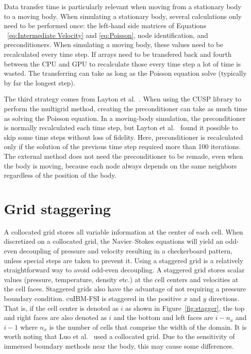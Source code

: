 Data transfer time is particularly relevant when moving from a stationary body to a moving body.
When simulating a stationary body, several calculations only need to be performed once: the left-hand side matrices of Equations ~\eqref{eq:Intermediate Velocity} and \eqref{eq:Poisson}, node identification, and preconditioners. 
When simulating a moving body, these values need to be recalculated every time step. 
If arrays need to be transfered back and fourth between the CPU and GPU to recalculate those every time step a lot of time is wasted.
The transferring can take as long as the Poisson equation solve (typically by far the longest step). 

The third strategy comes from Layton et al.~\cite{layton2011cuibm}.
When using the CUSP library to perform the multigrid method, creating the preconditioner can take as much time as solving the Poisson equation.
In a moving-body simulation, the preconditioner is normally recalculated each time step, but Layton et al.~\cite{layton2011cuibm} found it possible to skip some time steps without loss of fidelity.
Here, preconditioner is recalculated only if the solution of the previous time step required more than 100 iterations. 
The external method does not need the preconditioner to be remade, even when the body is moving, because each node always depends on the same neighbors regardless of the position of the body. 


\section{Grid staggering}
\label{Grid Staggering}

A collocated grid stores all variable information at the center of each cell.
When discretized on a collocated grid, the Navier--Stokes equations will yield an odd-even decoupling of pressure and velocity resulting in a checkerboard pattern, unless special steps are taken to prevent it. 
Using a staggered grid is a relatively straightforward way to avoid odd-even decoupling. 
A staggered grid stores scalar values (pressure, temperature, density etc.) at the cell centers and velocities at the cell faces. 
Staggered grids also have the advantage of not requiring a pressure boundary condition. 
cuIBM-FSI is staggered in the positive $x$ and $y$ directions. 
That is, if the cell center is denoted as $i$ as shown in Figure~\ref{fig:stagger}, the top and right faces are also denoted as $i$ and the bottom and left faces are $i-n_x$ and $i-1$ where $n_x$ is the number of cells that comprise the width of the domain. 
It is worth noting that Luo et al.~\cite{Luo:2012gx} used a collocated grid. 
Due to the sensitivity of immersed boundary methods near the body, this may cause some differences. 

